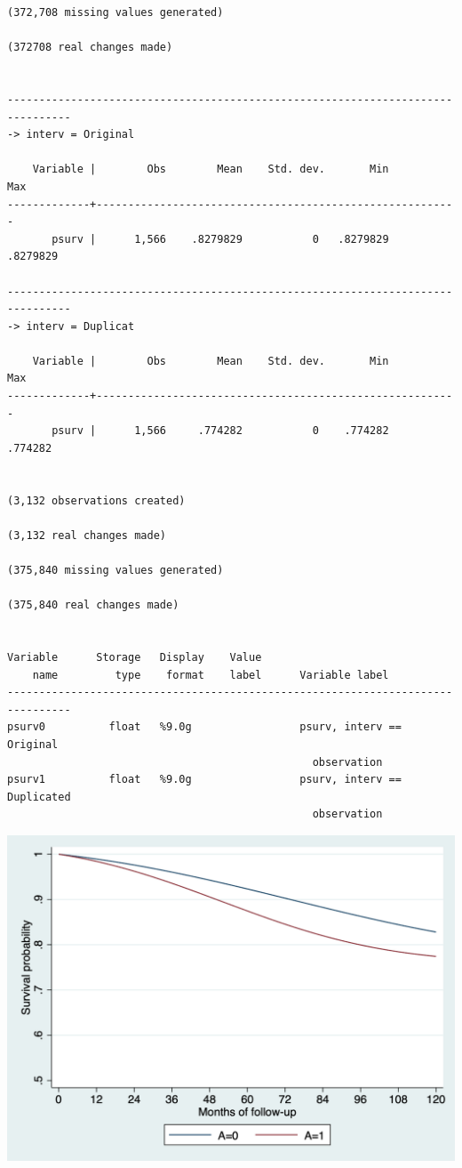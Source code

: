 \documentclass[
  10pt,
]{book}
\begin{document}
\begin{verbatim}
(372,708 missing values generated)

(372708 real changes made)


--------------------------------------------------------------------------------
-> interv = Original

    Variable |        Obs        Mean    Std. dev.       Min        Max
-------------+---------------------------------------------------------
       psurv |      1,566    .8279829           0   .8279829   .8279829

--------------------------------------------------------------------------------
-> interv = Duplicat

    Variable |        Obs        Mean    Std. dev.       Min        Max
-------------+---------------------------------------------------------
       psurv |      1,566     .774282           0    .774282    .774282


(3,132 observations created)

(3,132 real changes made)

(375,840 missing values generated)

(375,840 real changes made)


Variable      Storage   Display    Value
    name         type    format    label      Variable label
--------------------------------------------------------------------------------
psurv0          float   %9.0g                 psurv, interv == Original
                                                observation
psurv1          float   %9.0g                 psurv, interv == Duplicated
                                                observation
\end{verbatim}

\begin{center}\includegraphics[width=0.85\linewidth]{./figs/stata-fig-17-2} \end{center}
\end{document}
